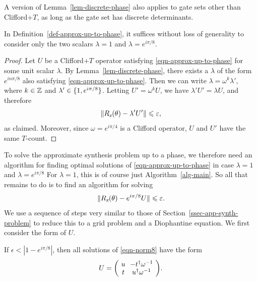 \documentclass{article}
\begin{document}
\begin{remark}
  A version of Lemma~\ref{lem-discrete-phase} also applies to gate
  sets other than Clifford+$T$, as long as the gate set has discrete
  determinants.
\end{remark}

\begin{corollary}\label{cor-only-two-phases}
  In Definition~\ref{def-approx-up-to-phase}, it suffices without loss
  of generality to consider only the two scalars $\lambda=1$ and
  $\lambda=e^{i\pi/8}$.
\end{corollary}

\begin{proof}
  Let $U$ be a Clifford+$T$ operator satisfying
  {\eqref{eqn-approx-up-to-phase}} for some unit scalar $\lambda$. By
  Lemma~\ref{lem-discrete-phase}, there exists a $\lambda$ of the form
  $e^{in\pi/8}$ also satisfying {\eqref{eqn-approx-up-to-phase}}.
  Then we can write $\lambda=\omega^k\lambda'$, where $k\in\mathbb{Z}$ and
  $\lambda'\in \{1,e^{i\pi/8}\}$. Letting $U'=\omega^k U$, we have
  $\lambda'U' = \lambda U$, and therefore
  \[ \|R_{\textsl{z}}(\theta)-\lambda' U'\| \leqslant \varepsilon,
  \]
  as claimed. Moreover, since $\omega=e^{i\pi/4}$ is a Clifford
  operator, $U$ and $U'$ have the same $T$-count.
\end{proof}

To solve the approximate synthesis problem up to a phase, we therefore
need an algorithm for finding optimal solutions of
{\eqref{eqn-approx-up-to-phase}} in case $\lambda=1$ and
$\lambda=e^{i\pi/8}$ For $\lambda=1$, this is of course just
Algorithm~\ref{alg-main}. So all that remains to do is to find an
algorithm for solving
\begin{equation}\label{eqn-norm8}
  \|R_{\textsl{z}}(\theta)-e^{i\pi/8}U\|\leqslant \varepsilon.
\end{equation}
We use a sequence of steps very similar to those of
Section~\ref{ssec-app-synth-problem} to reduce this to a grid problem
and a Diophantine equation.  We first consider the form of $U$.

\begin{lemma}\label{lem-ell8}
  If $\epsilon<|1-e^{i\pi/8}|$, then all solutions of
  {\eqref{eqn-norm8}} have the form
  \begin{equation}\label{eqn-u8}
    U = \zmatrix{cc}{u & -t\da\omega^{-1} \\ t & u\da\omega^{-1}}.
  \end{equation}
\end{lemma}
\end{document}
